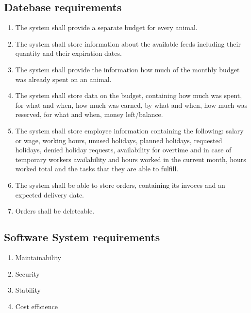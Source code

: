 \subsection{Datebase requirements}
\begin{enumerate}[label*=\arabic*]
    \item The system shall provide a separate budget for every animal.
    \item The system shall store information about the available feeds including their quantity and their expiration dates.
    \item The system shall provide the information how much of the monthly budget was already spent on an animal.
    \item The system shall store data on the budget, containing how much was spent, for what and when, how much was earned, by what and when, how much was reserved, for what and when, money left/balance.
    \item The system shall store employee information containing the following: salary or wage, working hours, unused holidays, planned holidays, requested holidays, denied holiday requests, availability for overtime and in case of temporary workers availability and hours worked in the current month, hours worked total and the tasks that they are able to fulfill.
    \item The system shall be able to store orders, containing its invoces and an expected delivery date.
    \item Orders shall be deleteable.
\end{enumerate}
\subsection{Software System requirements}
\begin{enumerate}[label*=\arabic*]
    \item Maintainability
    \item Security
    \item Stability
    \item Cost efficience
\end{enumerate}



      
